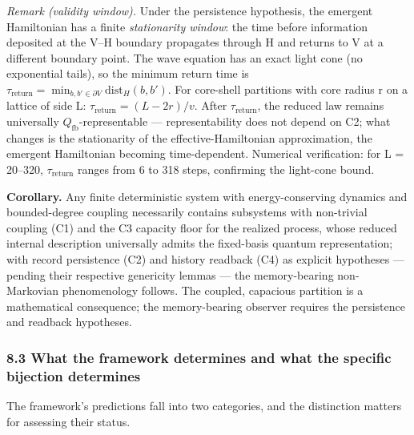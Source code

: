 \documentclass[
]{article}
\begin{document}
\emph{Remark (validity window).} Under the persistence hypothesis, the
emergent Hamiltonian has a finite \emph{stationarity window}: the time
before information deposited at the V--H boundary propagates through H
and returns to V at a different boundary point. The wave equation has an
exact light cone (no exponential tails), so the minimum return time is
\(\tau_{\mathrm{return}} = \min_{b, b' \in \partial V} \mathrm{dist}_H(b, b')\).
For core-shell partitions with core radius r on a lattice of side L:
\(\tau_{\mathrm{return}} = (L - 2r)/v\). After
\(\tau_{\mathrm{return}}\), the reduced law remains universally
\(Q_{\mathrm{fb}}\)-representable --- representability does not depend
on C2; what changes is the stationarity of the effective-Hamiltonian
approximation, the emergent Hamiltonian becoming time-dependent.
Numerical verification: for L = 20--320, \(\tau_{\mathrm{return}}\)
ranges from 6 to 318 steps, confirming the light-cone bound.

\textbf{Corollary.} Any finite deterministic system with
energy-conserving dynamics and bounded-degree coupling necessarily
contains subsystems with non-trivial coupling (C1) and the C3 capacity
floor for the realized process, whose reduced internal description
universally admits the fixed-basis quantum representation; with record
persistence (C2) and history readback (C4) as explicit hypotheses ---
pending their respective genericity lemmas --- the memory-bearing
non-Markovian phenomenology follows. The coupled, capacious partition is
a mathematical consequence; the memory-bearing observer requires the
persistence and readback hypotheses.

\hypertarget{what-the-framework-determines-and-what-the-specific-bijection-determines}{%
\subsubsection{8.3 What the framework determines and what the specific
bijection
determines}\label{what-the-framework-determines-and-what-the-specific-bijection-determines}}

The framework's predictions fall into two categories, and the
distinction matters for assessing their status.
\end{document}
